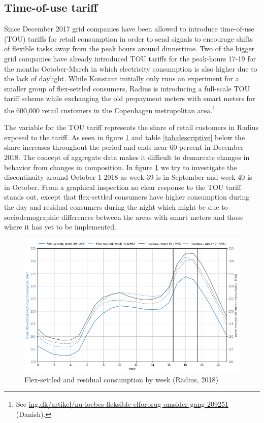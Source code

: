 \subsection{Time-of-use tariff}
\label{subsec:d_tout}
Since December 2017 grid companies have been allowed to introduce time-of-use (TOU) tariffs for retail consumption in order to send signals to encourage shifts of flexible tasks away from the peak hours around dinnertime. Two of the bigger grid companies have already introduced TOU tariffs for the peak-hours 17-19 for the months October-March in which electricity consumption is also higher due to the lack of daylight. While Konstant initially only runs an experiment for a smaller group of flex-settled consumers, Radius is introducing a full-scale TOU tariff scheme while exchanging the old prepayment meters with smart meters for the 600,000 retail customers in the Copenhagen metropolitan area.\footnote{See \href{https://ing.dk/artikel/nu-loebes-fleksible-elforbrug-omsider-gang-209251}{ing.dk/artikel/nu-loebes-fleksible-elforbrug-omsider-gang-209251} (Danish).}
\bigskip\par
The variable for the TOU tariff represents the share of retail customers in Radius exposed to the tariff. As seen in figure \ref{fig:radius_w39_w40} and table \ref{tab:descriptive} below the share increases throughout the period and ends near 60 percent in December 2018. The concept of aggregate data makes it difficult to demarcate changes in behavior from changes in composition. In figure \ref{fig:radius_w39_w40} we try to investigate the discontinuity around October 1 2018 as week 39 is in September and week 40 is in October. From a graphical inspection no clear response to the TOU tariff stands out, except that flex-settled consumers have higher consumption during the day and residual consumers during the night which might be due to sociodemographic differences between the areas with smart meters and those where it has yet to be implemented.
\begin{figure}[H]
  \centering
  \caption{Flex-settled and residual consumption by week (Radius, 2018)}
  \label{fig:radius_w39_w40}
      \includegraphics[width=1 \textwidth]{03_figures/radius_w39_w40}
\end{figure}

